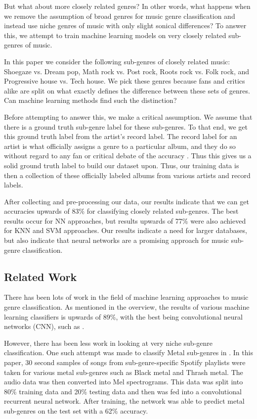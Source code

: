 \documentclass[letterpaper, 12 pt, conference]{ieeeconf}  %
\begin{document}
But what about more closely related genres? In other words, what happens when we remove the assumption of broad genres for music genre classification and instead use niche genres of music with only slight sonical differences?  To answer this, we attempt to train machine learning models on very closely related sub-genres of music. 

In this paper we consider the following sub-genres of closely related music: Shoegaze vs. Dream pop, Math rock vs. Post rock, Roots rock vs. Folk rock, and Progressive house vs. Tech house. We pick these genres because fans and critics alike are split on what exactly defines the difference between these sets of genres. Can machine learning methods find such the distinction? 

Before attempting to answer this, we make a critical assumption. We assume that there is a ground truth sub-genre label for these sub-genres. To that end, we get this ground truth label from the artist's record label. The record label for an artist is what officially assigns a genre to a particular album, and they do so without regard to any fan or critical debate of the accuracy \cite{c8}. Thus this gives us a solid ground truth label to build our dataset upon. Thus, our training data is then a collection of these officially labeled albums from various artists and record labels.

After collecting and pre-processing our data, our results indicate that we can get accuracies upwards of 83\%  for classifying closely related sub-genres. The best results occur for NN approaches, but results upwards of 77\% were also achieved for KNN and SVM approaches. Our results indicate a need for larger databases, but also indicate that neural networks are a promising approach for music sub-genre classification. 




\subsection{Related Work}


There has been lots of work in the field of machine learning approaches to music genre classification. As mentioned in the overview, the results of various machine learning classifiers is upwards of 89\%, with the best being convolutional neural networks (CNN),  such as \cite{c4}. 

However, there has been less work in looking at very niche sub-genre classification. One such attempt was made to classify Metal sub-genres in \cite{c5}. In this paper, 30 second samples of songs from sub-genre-specific Spotify playlists were taken for various metal sub-genres such as Black metal and Thrash metal. The audio data was then converted into Mel spectrograms. This data was split into 80\% training data and 20\% testing data and then was fed into a convolutional recurrent neural network. After training, the network was able to predict metal sub-genres on the test set with a 62\% accuracy. 
\end{document}

